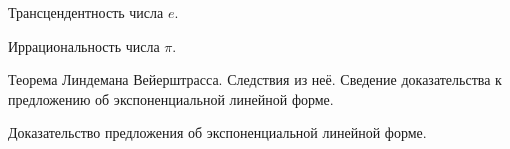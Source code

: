 \documentclass[a4paper]{article}
\begin{document}
\begin{nums}{-3.2}
\item  Трансцендентность числа $e$.

\item  Иррациональность числа $\pi$.

\item  Теорема Линдемана Вейерштрасса. Следствия из неё. Сведение
доказательства к предложению об экспоненциальной линейной форме.

\item  Доказательство предложения об экспоненциальной линейной форме.
\end{nums}

\medskip
\dmvntrail
\end{document}
